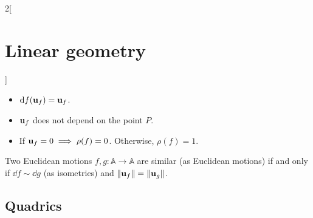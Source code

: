 \documentclass[../../../main.tex]{subfiles}
\begin{document}
\begin{multicols}{2}[\section{Linear geometry}]
\begin{prop}
        \begin{itemize}
            \item $\dd f(\boldsymbol{\mathrm{u}}_f)=\boldsymbol{\mathrm{u}}_f$.
            \item $\boldsymbol{\mathrm{u}}_f$ does not depend on the point $P$.
            \item If $\boldsymbol{\mathrm{u}}_f=0\implies\rho(f)=0$. Otherwise, $\rho(f)=1$.
        \end{itemize}
    \end{prop}
    \begin{theorem}
        Two Euclidean motions $f,g:\mathbb{A}\rightarrow\mathbb{A}$ are similar (as Euclidean motions) if and only if $\dd f\sim \dd g$ (as isometries) and $\|\boldsymbol{\mathrm{u}}_f\|=\|\boldsymbol{\mathrm{u}}_g\|$.
    \end{theorem}
    \subsection{Quadrics}

\end{multicols}
\end{document}
